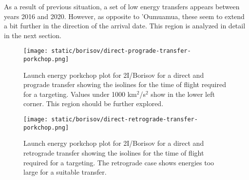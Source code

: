 As a result of previous situation, a set of low energy transfers appears between
years 2016 and 2020. However, as opposite to 'Oumuamua, these seem to extend a
bit further in the direction of the arrival date. This region is analyzed in
detail in the next section.

\begin{figure}[H]
  \centering
  \texttt{[image: static/borisov/direct-prograde-transfer-porkchop.png]}
        \caption[Direct and prograde launch energy porkchop for
        2I/Borisov]{Launch energy porkchop plot for 2I/Borisov for a direct and prograde
        transfer showing the isolines for
        the time of flight required for a targeting. Values under 1000
        km$^2$/s$^2$ show in the lower left corner. This region should be
        further explored.}
  \label{fig:borisov-direct-prograde-transfer-porkchop}
\end{figure}

\begin{figure}[H]
  \centering
  \texttt{[image: static/borisov/direct-retrograde-transfer-porkchop.png]}
        \caption[Direct and retrograde launch energy porkchop for
        2I/Borisov]{Launch energy porkchop plot for 2I/Borisov for a direct and
        retrograde transfer showing the isolines for
        the time of flight required for a targeting. The retrograde case shows
        energies too large for a suitable transfer.}
  \label{fig:borisov-direct-retrograde-transfer-porkchop}
\end{figure}

